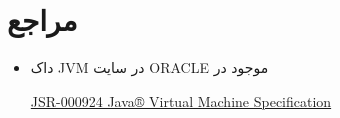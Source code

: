 \section*{مراجع}
\begin{itemize}
	\item
	داک JVM در سایت ORACLE موجود در 
	\begin{latin}
	\href{https://docs.oracle.com/javase/specs/jvms/se7/html/index.html}{JSR-000924 Java® Virtual Machine Specification}
	\end{latin}
\end{itemize}